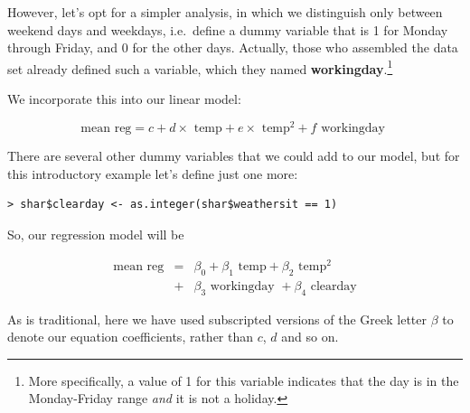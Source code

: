 However, let's opt for a simpler analysis, in which we distinguish only
between weekend days and weekdays, i.e.\ define a dummy variable that
is 1 for Monday through Friday, and 0 for the other days.  Actually,
those who assembled the data set already defined such a variable, which
they named {\bf workingday}.\footnote{More specifically, a value of 1
for this variable indicates that the day is in the Monday-Friday range
{\it and} it is not a holiday.}

We incorporate this into our linear model:

\begin{equation}
\textrm{mean reg} = c + 
d \times \textrm{ temp} + 
e \times \textrm{ temp}^2 + 
f \textrm{ workingday }
\end{equation}

% 
% 
% 



There are several other dummy variables that we could add to our model,
but for this introductory example let's define just one more:

\begin{lstlisting}
> shar$clearday <- as.integer(shar$weathersit == 1)
\end{lstlisting}

So, our regression model will be

\begin{eqnarray}
\textrm{mean reg} 
&=& 
\beta_0 + 
\beta_1 \textrm{ temp} + 
\beta_2 \textrm{ temp}^2 \nonumber \\
&+& 
\beta_3 \textrm{ workingday } +
\beta_4 \textrm{ clearday} 
\label{bikelin}
\end{eqnarray}

As is traditional, here we have used subscripted versions of the Greek
letter $\beta$ to denote our equation coefficients, rather than $c$, $d$
and so on.

